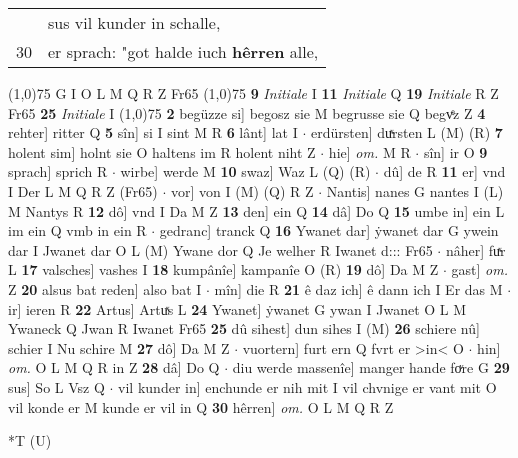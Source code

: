 \documentclass[8pt,a4paper,notitlepage]{article}
\begin{document}
\begin{table}[ht]
\begin{minipage}[t]{0.5\linewidth}
\begin{tabular}{rl}
 & sus vil kunder in schalle,\\ 
30 & er sprach: "got halde iuch \textbf{hêrren} alle,\\ 
\end{tabular}
\scriptsize
\line(1,0){75} \newline
G I O L M Q R Z Fr65 \newline
\line(1,0){75} \newline
\textbf{9} \textit{Initiale} I  \textbf{11} \textit{Initiale} Q  \textbf{19} \textit{Initiale} R Z Fr65  \textbf{25} \textit{Initiale} I  \newline
\line(1,0){75} \newline
\textbf{2} begüzze si] begosz sie M begrusse sie Q begvͤz Z \textbf{4} rehter] ritter Q \textbf{5} sîn] si I sint M R \textbf{6} lânt] lat I  $\cdot$ erdürsten] duͯrsten L (M) (R) \textbf{7} holent sim] holnt sie O haltens im R holent niht Z  $\cdot$ hie] \textit{om.} M R  $\cdot$ sîn] ir O \textbf{9} sprach] sprich R  $\cdot$ wirbe] werde M \textbf{10} swaz] Waz L (Q) (R)  $\cdot$ dû] de R \textbf{11} er] vnd I Der L M Q R Z (Fr65)  $\cdot$ vor] von I (M) (Q) R Z  $\cdot$ Nantis] nanes G nantes I (L) M Nantys R \textbf{12} dô] vnd I Da M Z \textbf{13} den] ein Q \textbf{14} dâ] Do Q \textbf{15} umbe in] ein L im ein Q vmb in ein R  $\cdot$ gedranc] tranck Q \textbf{16} Ywanet dar] ẏwanet dar G ywein dar I Jwanet dar O L (M) Ywane dor Q Je welher R Iwanet d::: Fr65  $\cdot$ nâher] fuͯr L \textbf{17} valsches] vashes I \textbf{18} kumpânîe] kampanîe O (R) \textbf{19} dô] Da M Z  $\cdot$ gast] \textit{om.} Z \textbf{20} alsus bat reden] also bat I  $\cdot$ mîn] die R \textbf{21} ê daz ich] ê dann ich I Er das M  $\cdot$ ir] ieren R \textbf{22} Artus] Artuͯs L \textbf{24} Ywanet] ẏwanet G ywan I Jwanet O L M Ywaneck Q Jwan R Iwanet Fr65 \textbf{25} dû sihest] dun sihes I (M) \textbf{26} schiere nû] schier I Nu schire M \textbf{27} dô] Da M Z  $\cdot$ vuortern] furt ern Q fvrt er >in< O  $\cdot$ hin] \textit{om.} O L M Q R in Z \textbf{28} dâ] Do Q  $\cdot$ diu werde massenîe] manger hande foͮre G \textbf{29} sus] So L Vsz Q  $\cdot$ vil kunder in] enchunde er nih mit I vil chvnige er vant mit O vil konde er M kunde er vil in Q \textbf{30} hêrren] \textit{om.} O L M Q R Z \newline
\end{minipage}
\hspace{0.5cm}
\begin{minipage}[t]{0.5\linewidth}
\small
\begin{center}*T (U)
\end{center}

\end{minipage}
\end{table}
\end{document}
